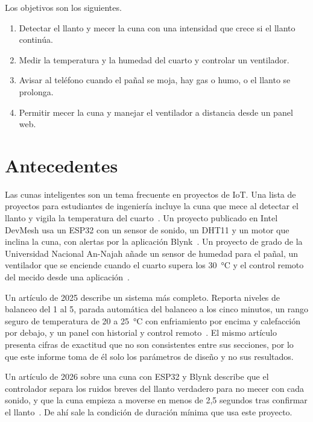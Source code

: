Los objetivos son los siguientes.

\begin{enumerate}[label=\arabic*.]
  \item Detectar el llanto y mecer la cuna con una intensidad que crece si el llanto
        continúa.
  \item Medir la temperatura y la humedad del cuarto y controlar un ventilador.
  \item Avisar al teléfono cuando el pañal se moja, hay gas o humo, o el llanto se
        prolonga.
  \item Permitir mecer la cuna y manejar el ventilador a distancia desde un panel web.
\end{enumerate}

\section{Antecedentes}

Las cunas inteligentes son un tema frecuente en proyectos de IoT. Una lista de
proyectos para estudiantes de ingeniería incluye la cuna que mece al detectar el
llanto y vigila la temperatura del cuarto~\cite{robocraze}. Un proyecto publicado en
Intel DevMesh usa un ESP32 con un sensor de sonido, un DHT11 y un motor que inclina
la cuna, con alertas por la aplicación Blynk~\cite{devmesh}. Un proyecto de grado de
la Universidad Nacional An-Najah añade un sensor de humedad para el pañal, un
ventilador que se enciende cuando el cuarto supera los 30~°C y el control remoto del
mecido desde una aplicación~\cite{najah}.

Un artículo de 2025 describe un sistema más completo. Reporta niveles de balanceo del
1 al 5, parada automática del balanceo a los cinco minutos, un rango seguro de
temperatura de 20 a 25~°C con enfriamiento por encima y calefacción por
debajo, y un panel con historial y control remoto~\cite{pmc}. El mismo artículo
presenta cifras de exactitud que no son consistentes entre sus secciones, por lo que
este informe toma de él solo los parámetros de diseño y no sus resultados.

Un artículo de 2026 sobre una cuna con ESP32 y Blynk describe que el controlador
separa los ruidos breves del llanto verdadero para no mecer con cada sonido, y que la
cuna empieza a moverse en menos de 2,5 segundos tras confirmar el llanto~\cite{ijirt}.
De ahí sale la condición de duración mínima que usa este proyecto.

